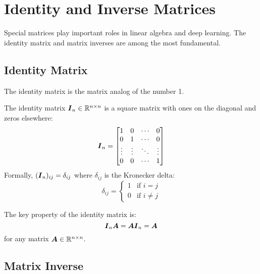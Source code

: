 
\section{Identity and Inverse Matrices }
\label{sec:identity-inverse}

Special matrices play important roles in linear algebra and deep learning. The identity matrix and matrix inverses are among the most fundamental.

\subsection{Identity Matrix}

The identity matrix is the matrix analog of the number 1.

\begin{definition}
The identity matrix $\boldsymbol{I}_n \in \mathbb{R}^{n \times n}$ is a square matrix with ones on the diagonal and zeros elsewhere:
\begin{equation}
    \boldsymbol{I}_n = \begin{bmatrix}
        1 & 0 & \cdots & 0 \\
        0 & 1 & \cdots & 0 \\
        \vdots & \vdots & \ddots & \vdots \\
        0 & 0 & \cdots & 1
    \end{bmatrix}
\end{equation}
Formally, $(\boldsymbol{I}_n)_{ij} = \delta_{ij}$ where $\delta_{ij}$ is the Kronecker delta:
\begin{equation}
    \delta_{ij} = \begin{cases}
        1 & \text{if } i = j \\
        0 & \text{if } i \neq j
    \end{cases}
\end{equation}
\end{definition}

The key property of the identity matrix is:
\begin{equation}
    \boldsymbol{I}_n\boldsymbol{A} = \boldsymbol{A}\boldsymbol{I}_n = \boldsymbol{A}
\end{equation}
for any matrix $\boldsymbol{A} \in \mathbb{R}^{n \times n}$.

\subsection{Matrix Inverse}


